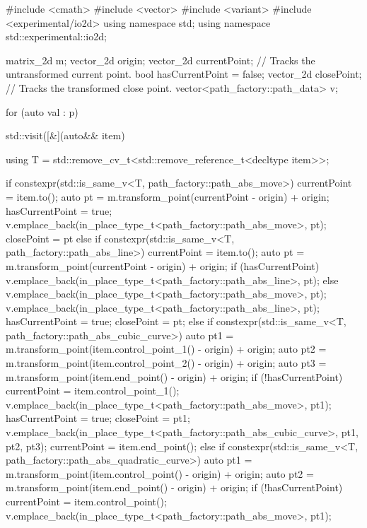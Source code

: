 \begin{codeblock}
  #include <cmath>
  #include <vector>
  #include <variant>
  #include <experimental/io2d>
  using namespace std;
  using namespace std::experimental::io2d;
  
  matrix_2d m;
  vector_2d origin;
  vector_2d currentPoint; // Tracks the untransformed current point.
  bool hasCurrentPoint = false;
  vector_2d closePoint;   // Tracks the transformed close point.
  vector<path_factory::path_data> v;
  
  for (auto val : p) {
    std::visit([&](auto&& item) {
      using T = std::remove_cv_t<std::remove_reference_t<decltype item>>;

      if constexpr(std::is_same_v<T, path_factory::path_abs_move>) {
        currentPoint = item.to();
        auto pt = m.transform_point(currentPoint - origin) + origin;
        hasCurrentPoint = true;
        v.emplace_back(in_place_type_t<path_factory::path_abs_move>, pt);
        closePoint = pt
      }
      else if constexpr(std::is_same_v<T, path_factory::path_abs_line>) {
        currentPoint = item.to();
        auto pt = m.transform_point(currentPoint - origin) + origin;
        if (hasCurrentPoint) {
          v.emplace_back(in_place_type_t<path_factory::path_abs_line>, pt);
        }
        else {
          v.emplace_back(in_place_type_t<path_factory::path_abs_move>, pt);
          v.emplace_back(in_place_type_t<path_factory::path_abs_line>, pt);
          hasCurrentPoint = true;
          closePoint = pt;
        }
      }
      else if constexpr(std::is_same_v<T, path_factory::path_abs_cubic_curve>) {
        auto pt1 = m.transform_point(item.control_point_1() - origin) + origin;
        auto pt2 = m.transform_point(item.control_point_2() - origin) + origin;
        auto pt3 = m.transform_point(item.end_point() - origin) + origin;
        if (!hasCurrentPoint) {
          currentPoint = item.control_point_1();
          v.emplace_back(in_place_type_t<path_factory::path_abs_move>, pt1);
          hasCurrentPoint = true;
          closePoint = pt1;
        }
        v.emplace_back(in_place_type_t<path_factory::path_abs_cubic_curve>, pt1,
          pt2, pt3);
        currentPoint = item.end_point();
      }
      else if constexpr(std::is_same_v<T,
        path_factory::path_abs_quadratic_curve>) {
      	auto pt1 = m.transform_point(item.control_point() - origin) + origin;
      	auto pt2 = m.transform_point(item.end_point() - origin) + origin;
      	if (!hasCurrentPoint) {
      		currentPoint = item.control_point();
      		v.emplace_back(in_place_type_t<path_factory::path_abs_move>, pt1);
}}}}
\end{codeblock}
